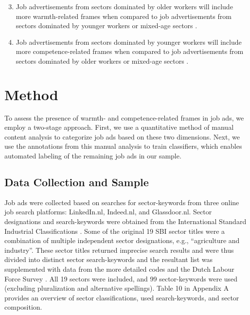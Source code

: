 \documentclass[man]{apa7}
\begin{document}
\begin{enumerate}[leftmargin=2.5cm, labelsep=0.25cm, align=left, label={\textbf{Hypothesis \arabic*:}}]
\setcounter{enumi}{2}

\item Job advertisements from sectors dominated by older workers will include more warmth-related frames when compared to job advertisements from sectors dominated by younger workers  or mixed-age sectors .

\item Job advertisements from sectors dominated by younger workers will include more competence-related frames when compared to job advertisements from sectors dominated by older workers  or mixed-age sectors .

\end{enumerate}

\section{Method}
\label{method}
To assess the presence of warmth- and competence-related frames in job ads, we employ a two-stage approach. First, we use a quantitative method of manual content analysis to categorize job ads based on these two dimensions. Next, we use the annotations from this manual analysis to train classifiers, which enables automated labeling of the remaining job ads in our sample.

\subsection{Data Collection and Sample}
Job ads were collected based on searches for sector-keywords from three online job search platforms: LinkedIn.nl, Indeed.nl, and Glassdoor.nl. Sector designations and search-keywords were obtained from the International Standard Industrial Classifications \parencite[SBI;][]{centraal_bureau_voor_de_statistiek_standard_2018}. Some of the original 19 SBI sector titles were a combination of multiple independent sector designations, e.g., “agriculture and industry”. These sector titles returned imprecise search results and were thus divided into distinct sector search-keywords and the resultant list was supplemented with data from the more detailed codes and the Dutch Labour Force Survey \parencite{centraal_bureau_voor_de_statistiek_dutch_2021}. All 19 sectors were included, and 99 sector-keywords were used (excluding pluralization and alternative spellings). Table 10 in Appendix A provides an overview of sector classifications, used search-keywords, and sector composition.
\end{document}

